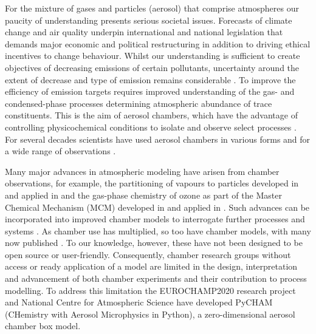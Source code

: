 \documentclass[gmd, manuscript]{copernicus}
\begin{document}

\introduction

For the mixture of gases and particles (aerosol) that comprise atmospheres our paucity of understanding presents serious societal issues.  Forecasts of climate change and air quality underpin international and national legislation \citep[e.g.][]{UNFCCC2018, UKEnvironmentBill2020, EUAQ2020} that demands major economic and political restructuring \citep{MIT2020} in addition to driving ethical incentives to change behaviour.  Whilst our understanding is sufficient to create objectives of decreasing emissions of certain pollutants, uncertainty around the extent of decrease and type of emission remains considerable \citep{Heal2012, Johnson2018, Tong2019}.  To improve the efficiency of emission targets requires improved understanding of the gas- and condensed-phase processes determining atmospheric abundance of trace constituents.  This is the aim of aerosol chambers, which have the advantage of controlling physicochemical conditions to isolate and observe select processes \citep{Schwantes2017, Charan2019}.  For several decades scientists have used aerosol chambers in various forms and for a wide range of observations \citep[e.g.][]{Griffin1956}.

Many major advances in atmospheric modeling have arisen from chamber observations, for example, the partitioning of vapours to particles developed in \citet{Odum1996} and applied in \citet[e.g.][]{Meng1997} and the gas-phase chemistry of ozone as part of the Master Chemical Mechanism (MCM) developed in \citet{Jenkin1997} and applied in \citet[e.g.][]{Ying2011}.  Such advances can be incorporated into improved chamber models \citep[e.g.][]{Charan2019} to interrogate further processes and systems \citep[e.g.][]{Riva2020}.  As chamber use has multiplied, so too have chamber models, with many now published \citep{Naumann2003, Pierce2008, Roldin2014, Sunol2018, Charan2019, Roldin2019}.  To our knowledge, however, these have not been designed to be open source or user-friendly.  Consequently, chamber research groups without access or ready application of a model are limited in the design, interpretation and advancement of both chamber experiments and their contribution to process modelling.  To address this limitation the EUROCHAMP2020 \citep{EUROCHAMP2020} research project and National Centre for Atmospheric Science have developed PyCHAM (CHemistry with Aerosol Microphysics in Python), a zero-dimensional aerosol chamber box model.  
\end{document}
